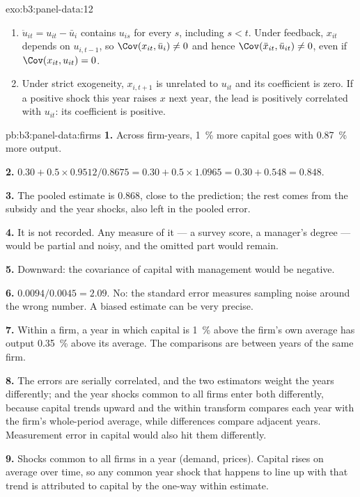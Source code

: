 \begin{solution}{exo:b3:panel-data:12}
\begin{enumerate}
\item $\ddot u_{it} = u_{it} - \bar u_i$ contains $u_{is}$ for every $s$,
including $s < t$. Under feedback, $x_{it}$ depends on $u_{i,t-1}$, so
$\Cov(x_{it}, \bar u_i) \neq 0$ and hence $\Cov(\ddot x_{it}, \ddot u_{it}) \neq
0$, even if $\Cov(x_{it}, u_{it}) = 0$.
\item Under strict exogeneity, $x_{i,t+1}$ is unrelated to $u_{it}$ and its
coefficient is zero. If a positive shock this year raises $x$ next year, the
lead is positively correlated with $u_{it}$: its coefficient is positive.
\end{enumerate}
\end{solution}

\begin{solution}{pb:b3:panel-data:firms}
\textbf{1.} Across firm-years, 1~\% more capital goes with 0.87~\% more output.

\textbf{2.} $0.30 + 0.5 \times 0.9512/0.8675 = 0.30 + 0.5 \times 1.0965 = 0.30
+ 0.548 = 0.848$.

\textbf{3.} The pooled estimate is 0.868, close to the prediction; the rest
comes from the subsidy and the year shocks, also left in the pooled error.

\textbf{4.} It is not recorded. Any measure of it --- a survey score, a
manager's degree --- would be partial and noisy, and the omitted part would
remain.

\textbf{5.} Downward: the covariance of capital with management would be
negative.

\textbf{6.} $0.0094/0.0045 = 2.09$. No: the standard error measures sampling
noise around the wrong number. A biased estimate can be very precise.

\textbf{7.} Within a firm, a year in which capital is 1~\% above the firm's own
average has output 0.35~\% above its average. The comparisons are between
years of the same firm.

\textbf{8.} The errors are serially correlated, and the two estimators weight
the years differently; and the year shocks common to all firms enter both
differently, because capital trends upward and the within transform compares
each year with the firm's whole-period average, while differences compare
adjacent years. Measurement error in capital would also hit them differently.

\textbf{9.} Shocks common to all firms in a year (demand, prices). Capital
rises on average over time, so any common year shock that happens to line up
with that trend is attributed to capital by the one-way within estimate.


\end{solution}
